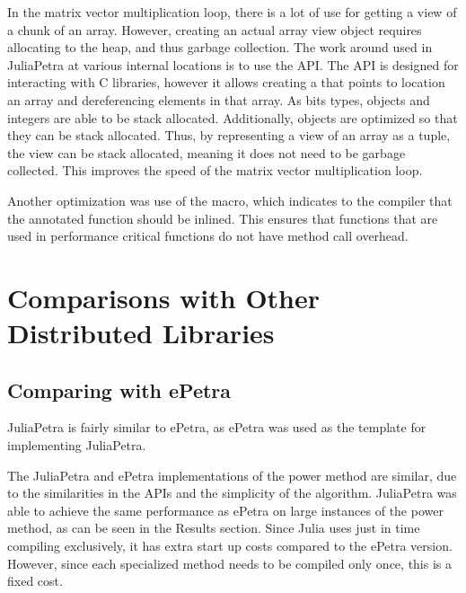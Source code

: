 \documentclass[acmsmall]{acmart}
\newcommand{\juliaSnippet}[1]{\texttt{\detokenize{#1}}}
\begin{document}
In the matrix vector multiplication loop, there is a lot of use for getting a view of a chunk of an array.
However, creating an actual array view object requires allocating to the heap, and thus garbage collection.
The work around used in JuliaPetra at various internal locations is to use the \juliaSnippet{Ptr} API.
The \juliaSnippet{Ptr} API is designed for interacting with C libraries, however it allows creating
a \juliaSnippet{Ptr} that points to location an array and dereferencing elements in that array.
As bits types, \juliaSnippet{Ptr} objects and integers are able to be stack allocated.
Additionally, \juliaSnippet{Tuple} objects are optimized so that they can be stack allocated.
Thus, by representing a view of an array as a \juliaSnippet{(Ptr, Integer)} tuple, the view
can be stack allocated, meaning it does not need to be garbage collected.
This improves the speed of the matrix vector multiplication loop.

Another optimization was use of the \juliaSnippet{@inline} macro, which indicates to the
compiler that the annotated function should be inlined.
This ensures that functions that are used in performance critical functions do not have
method call overhead.

\section{Comparisons with Other Distributed Libraries}

\subsection{Comparing with ePetra}

JuliaPetra is fairly similar to ePetra, as ePetra was used as the template for implementing JuliaPetra.

The JuliaPetra and ePetra implementations of the power method are similar, due to the similarities
in the APIs and the simplicity of the algorithm.
JuliaPetra was able to achieve the same performance as ePetra on large instances of the power method,
as can be seen in the Results section.
Since Julia uses just in time compiling exclusively, it has extra start up costs compared to
the ePetra version. However, since each specialized method needs to be compiled only once,
this is a fixed cost.
\end{document}
